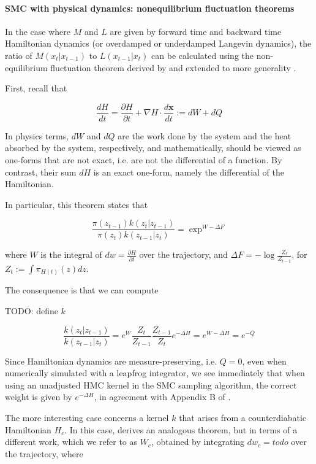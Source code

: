 \documentclass{article}
\begin{document}
\paragraph{SMC with physical dynamics: nonequilibrium fluctuation theorems}

In the case where $M$ and $L$ are given by forward time and backward time Hamiltonian dynamics (or overdamped or underdamped Langevin dynamics), the ratio of $M(x_t | x_{t-1})$ to $L(x_{t-1} | x_t)$ can be calculated using the non-equilibrium fluctuation theorem derived by \cite{crooks1998nonequilibrium} and extended to more generality \cite{todo}.

First, recall that

$$
\frac{dH}{dt} = \frac{\partial H}{\partial t} + \nabla H \cdot \frac{d\mathbf{x}}{dt} := dW + dQ
$$

In physics terms, $dW$ and $dQ$ are the work done by the system and the heat absorbed by the system, respectively, and mathematically, should be viewed as one-forms that are not exact, i.e. are not the differential of a function. By contrast, their sum $dH$ is an exact one-form, namely the differential of the Hamiltonian.

In particular, this theorem states that

$$
\frac{\pi(z_{t-1})k(z_t | z_{t-1})}{\pi(z_t)k(z_{t-1} | z_t)} = \exp^{W - \Delta F}
$$

where $W$ is the integral of $dw = \frac{\partial H}{\partial t}$ over the trajectory, and $\Delta F = -\log\frac{Z_t}{Z_{t-1}}$, for $Z_t := \int \pi_{H(t)}(z)dz$.

The consequence is that we can compute 

TODO: define $k$

$$
\frac{k(z_t | z_{t-1})}{k(z_{t-1} | z_t)} = e^W\frac{Z_t}{Z_{t-1}}\frac{Z_{t-1}}{Z_t}e^{-\Delta H} = e^{W - \Delta H} = e^{-Q}
$$

Since Hamiltonian dynamics are measure-preserving, i.e. $Q=0$, even when numerically simulated with a leapfrog integrator, we see immediately that when using an unadjusted HMC kernel in the SMC sampling algorithm, the correct weight is given by $e^{-\Delta H}$, in agreement with Appendix B of \cite{dai2022invitation}.

The more interesting case concerns a kernel $k$ that arises from a counterdiabatic Hamiltonian $H_c$. In this case, \cite{zhong2024time} derives an analogous theorem, but in terms of a different work, which we refer to as $W_c$, obtained by integrating $dw_c = todo$ over the trajectory, where
\end{document}
